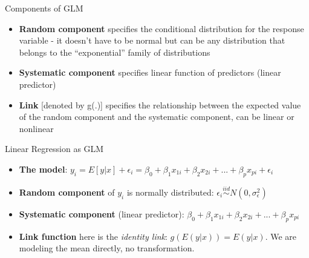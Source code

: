 \documentclass[
  ignorenonframetext,
]{beamer}
\providecommand{\tightlist}{%
  \setlength{\itemsep}{0pt}\setlength{\parskip}{0pt}}
\begin{document}
\begin{frame}{Components of GLM}
\protect\hypertarget{components-of-glm}{}

\begin{itemize}
\tightlist
\item
  \textbf{Random component} specifies the conditional distribution for
  the response variable - it doesn't have to be normal but can be any
  distribution that belongs to the ``exponential'' family of
  distributions
\item
  \textbf{Systematic component} specifies linear function of predictors
  (linear predictor)
\item
  \textbf{Link} {[}denoted by g(.){]} specifies the relationship between
  the expected value of the random component and the systematic
  component, can be linear or nonlinear
\end{itemize}

\end{frame}

\begin{frame}{Linear Regression as GLM}
\protect\hypertarget{linear-regression-as-glm}{}

\begin{itemize}
\item
  \textbf{The model}:
  \(y_i = E[y|x] + \epsilon_i = \beta_0 + \beta_1 x_{1i} + \beta_2 x_{2i} + ... + \beta_p x_{pi} + \epsilon_i\)
\item
  \textbf{Random component} of \(y_i\) is normally distributed:
  \(\epsilon_i \stackrel{iid}{\sim} N(0, \sigma_\epsilon^2)\)
\item
  \textbf{Systematic component} (linear predictor):
  \(\beta_0 + \beta_1 x_{1i} + \beta_2 x_{2i} + ... + \beta_p x_{pi}\)
\item
  \textbf{Link function} here is the \emph{identity link}:
  \(g(E(y | x)) = E(y | x)\). We are modeling the mean directly, no
  transformation.
\end{itemize}

\end{frame}
\end{document}
